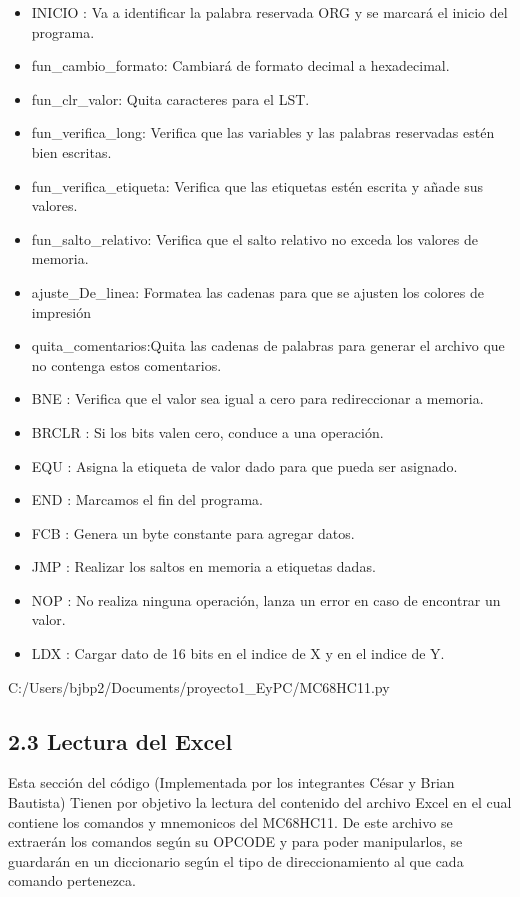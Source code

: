 \documentclass[letterpaper]{report}
\begin{document}
    \begin{itemize}
        \item INICIO : Va a identificar la palabra reservada ORG y se marcar\'a el inicio del programa.
        \item fun\_cambio\_formato: Cambiará de formato decimal a hexadecimal.
        \item fun\_clr\_valor: Quita caracteres para el LST. 
        \item fun\_verifica\_long: Verifica que las variables y las palabras reservadas estén bien 
        escritas.
        \item fun\_verifica\_etiqueta: Verifica que las etiquetas estén escrita y añade sus valores.
        \item fun\_salto\_relativo: Verifica que el salto relativo no exceda los valores de memoria.
        \item ajuste\_De\_linea: Formatea las cadenas para que se ajusten los colores
        de impresi\'on
        \item quita\_comentarios:Quita las cadenas de palabras para generar el archivo que no contenga estos 
        comentarios.
        \item BNE : Verifica que el valor sea igual a cero para redireccionar a memoria.
        \item BRCLR : Si los bits valen cero, conduce a una operación.
        \item EQU : Asigna la etiqueta de valor dado para que pueda ser asignado.
        \item END : Marcamos el fin del programa.
        \item FCB : Genera un byte constante para agregar datos.
        \item JMP : Realizar los saltos en memoria a etiquetas dadas. 
        \item NOP : No realiza ninguna operaci\'on, lanza un error en caso de encontrar
         un valor.
        \item LDX : Cargar dato de 16 bits en el indice de X y en el indice de Y.
    \end{itemize}
    
    {C:/Users/bjbp2/Documents/proyecto1_EyPC/MC68HC11.py}

    \subsection*{2.3 Lectura del Excel}
    Esta sección del código (Implementada por los integrantes César y Brian Bautista) Tienen
    por objetivo la lectura del contenido del archivo Excel en el cual contiene
    los comandos y mnemonicos del MC68HC11. De este archivo se extraer\'an los comandos 
    según su OPCODE y para poder manipularlos, se guardar\'an en un diccionario según
    el tipo de direccionamiento al que cada comando pertenezca.
\end{document}
